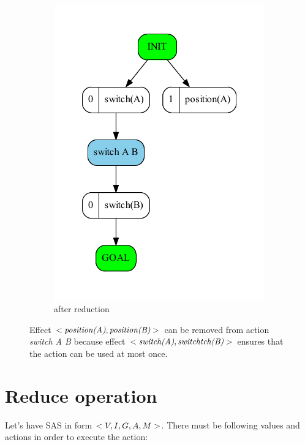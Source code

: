 \begin{figure}
\begin{subfigure}[b]{0.4\textwidth}
			\includegraphics[scale=0.4]{oneEffectDelete/figures/simple_output}
		\caption{after reduction}
		\end{subfigure}
		\caption{Effect $<\emph{position(A)},\emph{position(B)}>$ can be removed from action \emph{switch A B} because effect $<\emph{switch(A)},\emph{switchtch(B)}>$ ensures that the action can be used at most once.}
	\end{figure}               
	
	
	
	\section{Reduce operation}
	Let's have SAS in form $<V, I, G, A, M{}>$. There must be following values and actions in order to execute the action:
	
